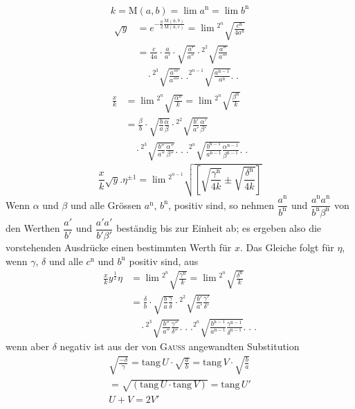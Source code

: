 \[
k=\mathrm M(a,b)=\lim a^{\mathrm n}=\lim b^{\mathrm n}
\]
\[
\begin{aligned}
\surd y&=e^{-\frac\pi2\frac{\mathrm M(a,b)}{\mathrm M(a,c)}}
=\lim{}^{2^n}\!\surd{\frac{c^{\mathrm n}}{4a^{\mathrm n}}}\\
&=\frac{c}{4a}\cdot\frac a{a'}\cdot\surd{\frac{a'}{a''}}
\cdot{}^{2^2}\!\surd{\frac{a''}{a'''}}\\&\quad\cdot{}^{2^3}\!\surd{\frac{a'''}{a''''}}
.\;.{}^{2^{n-1}}\!\surd{\frac{a^{\mathrm n-1}}{a^{\mathrm n}}}.\;.
\end{aligned}
\]
\[
\begin{aligned}
\frac xk&=\lim{}^{2^n}\!\surd{\frac{\alpha^{\mathrm n}}{k}}
=\lim{}^{2^n}\!\surd{\frac{\beta^{\mathrm n}}{k}}\\
&=\frac\beta b\cdot\surd{\frac ba\frac\alpha\beta}
\cdot{}^{2^2}\!\surd{\frac{b'}{a'}\frac{\alpha'}{\beta'}}
\\&\quad\cdot{}^{2^3}\!\surd{\frac{b''}{a''}\frac{\alpha''}{\beta''}}
.\;.\;.{}^{2^n}\!\surd{\frac{b^{\mathrm n-1}}{a^{\mathrm n-1}}\frac{\alpha^{\mathrm n-1}}{\beta^{\mathrm n-1}}}.\;.
\end{aligned}
\]
\[
\frac xk\surd y.\eta^{\pm1}
=\lim{}^{2^{n-1}}\!\surd{\left[\surd{\frac{\gamma^{\mathrm n}}{4k}}\pm\surd{\frac{\delta^{\mathrm n}}{4k}}\right]}
\]
Wenn $\alpha$ und $\beta$ und alle Grössen $a^{\mathrm n}$, $b^{\mathrm n}$, positiv sind, so nehmen
$\dfrac{a^{\mathrm n}}{b^{\mathrm n}}$ und $\dfrac{a^{\mathrm n}a^{\mathrm n}}{b^{\mathrm n}\beta^{\mathrm n}}$ von den Werthen
$\dfrac{a'}{b'}$ und $\dfrac{a'a'}{b'\beta'}$ beständig bis zur Einheit ab;
es ergeben also die vorstehenden Ausdrücke einen bestimmten Werth für $x$.
Das Gleiche folgt für $\eta$, wenn $\gamma$, $\delta$ und alle $c^{\mathrm n}$ und $b^{\mathrm n}$ positiv sind, aus
\[
\begin{aligned}
\frac xk y^{\frac12}\eta&=\lim{}^{2^n}\!\surd{\frac{\gamma^{\mathrm n}}{k}}
=\lim{}^{2^n}\!\surd{\frac{\delta^{\mathrm n}}{k}}\\
&=\frac\delta b\cdot\surd{\frac ba\frac\gamma\delta}
\cdot{}^{2^2}\!\surd{\frac{b'}{a'}\frac{\gamma'}{\delta'}}
\\&\quad\cdot{}^{2^3}\!\surd{\frac{b''}{a''}\frac{\gamma''}{\delta''}}
.\;.\;.{}^{2^n}\!\surd{\frac{b^{\mathrm n-1}}{a^{\mathrm n-1}}\frac{\gamma^{\mathrm n-1}}{\delta^{\mathrm n-1}}}.\;.\;.
\end{aligned}
\]
wenn aber $\delta$ negativ ist aus der von \textsc{Gauss} angewandten Substitution
\[
\begin{gathered}
\surd{\frac{-\delta}{\gamma}}
=\mathrm{tang}\,U\cdot\surd{\frac ab}
=\mathrm{tang}\,V\cdot\surd{\frac ba}
\\=\surd{(\mathrm{tang}\,U\cdot\mathrm{tang}\,V)}
=\mathrm{tang}\,U'\\
U+V=2V'
\end{gathered}
\]

